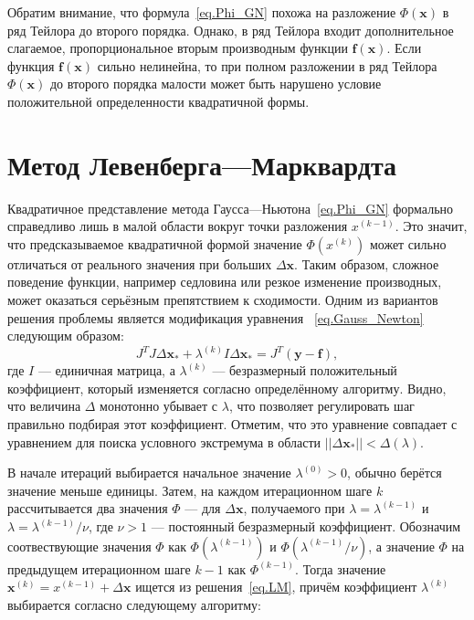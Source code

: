 \documentclass[fontsize=12pt, paper=a4]{article}
\renewcommand{\vec}[1]{\mathbf{#1}}
\def\x{\vec{x}}
\def\y{\vec{y}}
\def\f{\vec{f}}
\def\m{\x_*}
\begin{document}
Обратим внимание, что формула~\eqref{eq.Phi_GN} похожа на разложение $\Phi(\x)$ в ряд Тейлора до второго порядка.
Однако, в ряд Тейлора входит дополнительное слагаемое, пропорциональное вторым производным функции $\f(\x)$.
Если функция $\f(\x)$ сильно нелинейна, то при полном разложении в ряд Тейлора $\Phi(\x)$ до второго порядка малости может быть нарушено условие положительной определенности квадратичной формы.


\section{Метод Левенберга---Марквардта}
Квадратичное представление метода Гаусса---Ньютона~\eqref{eq.Phi_GN} формально справедливо лишь в малой области вокруг точки разложения $x^{(k-1)}$.
Это значит, что предсказываемое квадратичной формой значение $\Phi(x^{(k)})$ может сильно отличаться от реального значения при больших $\Delta\x$.
Таким образом, сложное поведение функции, например седловина или резкое изменение производных, может оказаться серьёзным препятствием к сходимости.
Одним из вариантов решения проблемы является модификация уравнения ~\eqref{eq.Gauss_Newton} следующим образом:
\begin{equation}
J^TJ \Delta\m + \lambda^{(k)} I \Delta\m = J^T (\y -\f), \label{eq.LM}
\end{equation}
где $I$ --- единичная матрица, а $\lambda^{(k)}$ --- безразмерный положительный коэффициент, который изменяется согласно определённому алгоритму.
Видно, что величина $\Delta$ монотонно убывает с $\lambda$, что позволяет регулировать шаг правильно подбирая этот коэффициент.
Отметим, что это уравнение совпадает с уравнением для поиска условного экстремума в области $||\Delta\m|| < \Delta(\lambda)$.

В начале итераций выбирается начальное значение $\lambda^{(0)} > 0$, обычно берётся значение меньше единицы.
Затем, на каждом итерационном шаге $k$ рассчитывается два значения $\Phi$ — для $\Delta\x$, получаемого при $\lambda = \lambda^{(k-1)}$ и $\lambda = \lambda^{(k-1)} / \nu$, где $\nu > 1$ --- постоянный безразмерный коэффициент.
Обозначим соотвествующие значения $\Phi$ как $\Phi( \lambda^{(k-1)})$ и $\Phi(\lambda^{(k-1)} / \nu)$, а значение $\Phi$ на предыдущем итерационном шаге $k-1$ как $\Phi^{(k-1)}$.
Тогда значение $\x^{(k)} = x^{(k-1)} + \Delta\x$ ищется из решения~\eqref{eq.LM}, причём коэффициент $\lambda^{(k)}$ выбирается согласно следующему алгоритму:
\end{document}
